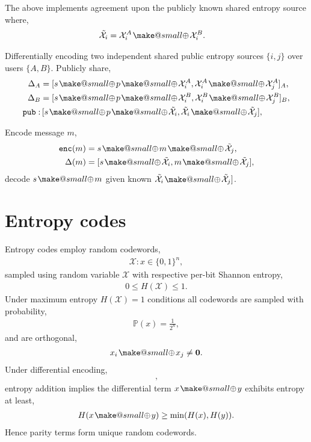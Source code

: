 \documentclass[twocolumn, aps, amsmath, amssymb, nofootinbib, superscriptaddress, longbibliography, doublefloatfix, table-of-contents, eqsecnum, rmp]{revtex4-2}
\makeatletter
\newcommand{\soplus}{{{\hspace{1pt}}{\mathbin{\mathpalette\make@small{\mathbin\oplus}}}}{\hspace{1pt}}}
\newcommand{\make@small}[2]{%
  \vcenter{\hbox{%
    \scalebox{0.6}{$\m@th#1#2$}%
  }}%
}
\makeatother
\begin{document}
The above implements agreement upon the publicly known shared entropy source where,
\begin{align}
	\tilde{\mathcal{X}}_i &= \mathcal{X}_i^A \soplus \mathcal{X}_i^B.
\end{align}

Differentially encoding two independent shared public entropy sources $\{i,j\}$ over users $\{A,B\}$. Publicly share,
\begin{align}
\Delta_A &= [s\soplus p\soplus{\mathcal{X}}_i^A, {\mathcal{X}}_i^A \soplus {\mathcal{X}}_j^A]_A,\nonumber\\
\Delta_B &= [s\soplus p\soplus {\mathcal{X}}_i^B, {\mathcal{X}}_i^B \soplus {\mathcal{X}}_j^B]_B,\nonumber\\
\mathtt{pub}:&\, [s\soplus p\soplus \tilde{\mathcal{X}}_i, \tilde{\mathcal{X}}_i \soplus \tilde{\mathcal{X}}_j],
\end{align}

Encode message $m$,
\begin{align}
\mathtt{enc}(m) &= s\soplus m \soplus \tilde{\mathcal{X}}_j,\nonumber\\
\Delta(m) &= [s\soplus \tilde{\mathcal{X}}_i, m \soplus \tilde{\mathcal{X}}_j],
\end{align}
decode $s\soplus m$ given known $\tilde{\mathcal{X}}_i \soplus \tilde{\mathcal{X}}_j]$.

\section{Entropy codes}

Entropy codes employ random codewords,
\begin{align}
	\mathcal{X}: x \in \{0,1\}^n,
\end{align}
sampled using random variable $\mathcal{X}$ with respective per-bit Shannon entropy,
\begin{align}
	0\leq H(\mathcal{X})\leq 1.
\end{align}
Under maximum entropy $H(\mathcal{X})=1$ conditions all codewords are sampled with probability,
\begin{align}
	\mathbb{P}(x) = \frac{1}{2^n},	
\end{align}
and are orthogonal,
\begin{align}
	x_i \soplus x_j \neq \mathbf{0}.
\end{align}
Under differential encoding,
\begin{align}
	[x,x\soplus y],
\end{align}
entropy addition implies the differential term $x\soplus y$ exhibits entropy at least,
\begin{align}
	H(x\soplus y) \geq \min(H(x),H(y)).
\end{align}
Hence parity terms form unique random codewords.
\end{document}
